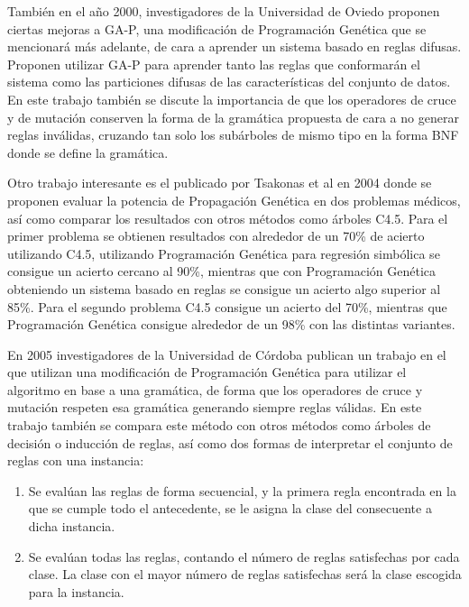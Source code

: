 También en el año 2000, investigadores de la Universidad de Oviedo proponen \cite{GAPnichosFuzzyRules} ciertas mejoras a GA-P, una modificación de Programación Genética que se mencionará más adelante, de cara a aprender un sistema basado en reglas difusas. Proponen utilizar GA-P para aprender tanto las reglas que conformarán el sistema como las particiones difusas de las características del conjunto de datos. En este trabajo también se discute la importancia de que los operadores de cruce y de mutación conserven la forma de la gramática propuesta de cara a no generar reglas inválidas, cruzando tan solo los subárboles de mismo tipo en la forma BNF donde se define la gramática.

Otro trabajo interesante es el publicado por Tsakonas et al en 2004 \cite{reglasDosDominiosMedicosComparacion} donde se proponen evaluar la potencia de Propagación Genética en dos problemas médicos, así como comparar los resultados con otros métodos como árboles C4.5. Para el primer problema se obtienen resultados con alrededor de un 70\% de acierto utilizando C4.5, utilizando Programación Genética para regresión simbólica se consigue un acierto cercano al 90\%, mientras que con Programación Genética obteniendo un sistema basado en reglas se consigue un acierto algo superior al 85\%. Para el segundo problema C4.5 consigue un acierto del 70\%, mientras que Programación Genética consigue alrededor de un 98\% con las distintas variantes.

En 2005 investigadores de la Universidad de Córdoba publican un trabajo \cite{grammarBasedPG} en el que utilizan una modificación de Programación Genética para utilizar el algoritmo en base a una gramática, de forma que los operadores de cruce y mutación respeten esa gramática generando siempre reglas válidas. En este trabajo también se compara este método con otros métodos como árboles de decisión o inducción de reglas, así como dos formas de interpretar el conjunto de reglas con una instancia:

\begin{enumerate}
	\item Se evalúan las reglas de forma secuencial, y la primera regla encontrada en la que se cumple todo el antecedente, se le asigna la clase del consecuente a dicha instancia.
	\item Se evalúan todas las reglas, contando el número de reglas satisfechas por cada clase. La clase con el mayor número de reglas satisfechas será la clase escogida para la instancia.
\end{enumerate}

